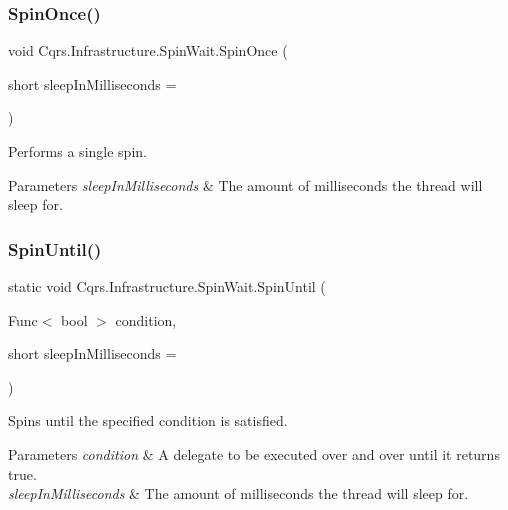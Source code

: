 \subsubsection{\texorpdfstring{Spin\+Once()}{SpinOnce()}}
{\footnotesize\ttfamily void Cqrs.\+Infrastructure.\+Spin\+Wait.\+Spin\+Once (\begin{DoxyParamCaption}\item[{short}]{sleep\+In\+Milliseconds = {} }\end{DoxyParamCaption})}



Performs a single spin. 


\begin{DoxyParams}{Parameters}
{\em sleep\+In\+Milliseconds} & The amount of milliseconds the thread will sleep for.\\
\hline
\end{DoxyParams}
\mbox{\label{structCqrs_1_1Infrastructure_1_1SpinWait_ae6b5bdef734568b515fa8d2ed04af9bb_ae6b5bdef734568b515fa8d2ed04af9bb}} 
\subsubsection{\texorpdfstring{Spin\+Until()}{SpinUntil()}\hspace{0.1cm}{\footnotesize\ttfamily [1/3]}}
{\footnotesize\ttfamily static void Cqrs.\+Infrastructure.\+Spin\+Wait.\+Spin\+Until (\begin{DoxyParamCaption}\item[{Func$<$ bool $>$}]{condition,  }\item[{short}]{sleep\+In\+Milliseconds = {} }\end{DoxyParamCaption})\hspace{0.3cm}{\ttfamily [static]}}



Spins until the specified condition is satisfied. 


\begin{DoxyParams}{Parameters}
{\em condition} & A delegate to be executed over and over until it returns true.\\
\hline
{\em sleep\+In\+Milliseconds} & The amount of milliseconds the thread will sleep for.\\
\hline
\end{DoxyParams}

